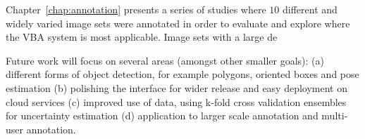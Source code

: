 Chapter~\ref{chap:annotation} presents a series of studies where $10$ different and widely varied image sets were annotated in order to evaluate and explore where the \gls{VBA} system is most applicable. Image sets with a large de  


Future work will focus on several areas (amongst other smaller goals): (a) different forms of object detection, for example polygons, oriented boxes and pose estimation (b) polishing the interface for wider release and easy deployment on cloud services (c) improved use of data, using k-fold cross validation ensembles for uncertainty estimation (d) application to larger scale annotation and multi-user annotation.
